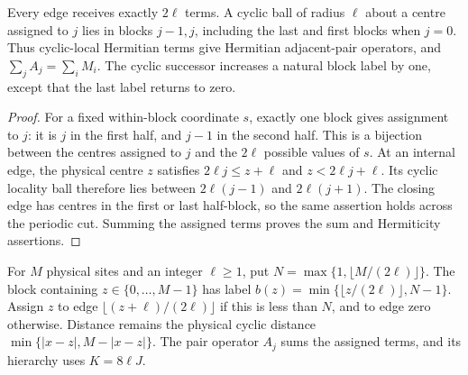 \begin{lemma}
    \label{thm:hastings_regular_periodic_grouping}
    \leanok
    Every edge receives exactly $2\ell$ terms. A cyclic ball of radius
    $\ell$ about a centre assigned to $j$ lies in blocks $j-1,j$,
    including the last and first blocks when $j=0$. Thus cyclic-local
    Hermitian terms give Hermitian adjacent-pair operators, and
    $\sum_jA_j=\sum_iM_i$. The cyclic successor increases a natural
    block label by one, except that the last label returns to zero.
\end{lemma}
\begin{proof}\leanok
    For a fixed within-block coordinate $s$, exactly one block gives
    assignment to $j$: it is $j$ in the first half, and $j-1$ in the
    second half. This is a bijection between the centres assigned to
    $j$ and the $2\ell$ possible values of $s$.
    At an internal edge, the physical centre $z$ satisfies
    $2\ell j\le z+\ell$ and $z<2\ell j+\ell$. Its cyclic locality ball
    therefore lies between $2\ell(j-1)$ and $2\ell(j+1)$.
    The closing edge has centres in the first or last half-block, so
    the same assertion holds across the periodic cut. Summing the
    assigned terms proves the sum and Hermiticity assertions.
\end{proof}

\begin{definition}
    \label{def:hastings_rounded_periodic_grouping}
    \leanok
    For $M$ physical sites and an integer $\ell\ge1$, put
    $N=\max\{1,\lfloor M/(2\ell)\rfloor\}$. The block containing
    $z\in\{0,\ldots,M-1\}$ has label
    $b(z)=\min\{\lfloor z/(2\ell)\rfloor,N-1\}$. Assign $z$ to
    edge $\lfloor(z+\ell)/(2\ell)\rfloor$ if this is less than $N$,
    and to edge zero otherwise. Distance remains the physical cyclic
    distance $\min\{|x-z|,M-|x-z|\}$. The pair operator $A_j$ sums the
    assigned terms, and its hierarchy uses $K=8\ell J$.
\end{definition}

